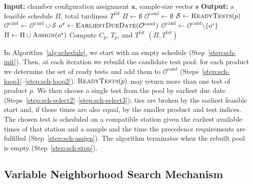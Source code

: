 \documentclass[11pt]{article}
\begin{document}
\begin{algorithm}[H]
\caption{\textsc{Schedule}()}
\label{alg:schedule}
\label{alg:scheduling}
\label{alg:scheduling_procedure}
\label{alg:scheduler_short}
\begin{algorithmic}[1]
\State \textbf{Input:} chamber configuration assignment \(\mathbf{x}\), sample-size vector \(\mathbf{s}\)
\State \textbf{Output:} a feasible schedule \(\Pi\), total tardiness \(T^{tot}\)
\State \(\Pi\leftarrow\emptyset\) \label{step:sch-init}
\Repeat \label{step:sch-loop}
    \State \(\mathcal{O}^{\mathrm{cand}}\leftarrow\emptyset\) \label{step:sch-pool}
     \label{step:sch-loop1}
        \State \(\mathcal{S}\leftarrow\Call{ReadyTests}{p}\) \label{step:sch-ready}
        \State \(\mathcal{O}^{\mathrm{cand}}\leftarrow\mathcal{O}^{\mathrm{cand}}\cup\mathcal{S}\)
    \EndFor \label{step:sch-loop2}
     \label{step:sch-select}
        \State \(o^{\star}\leftarrow\Call{EarliestDueDate}{\mathcal{O}^{\mathrm{cand}}}\) \label{step:sch-select2}
        \State \(\mathcal{O}^{\mathrm{cand}}\leftarrow\mathcal{O}^{\mathrm{cand}}\setminus\{o^{\star}\}\) \label{step:sch-select3}
        \State \(\Pi\leftarrow\Pi\cup\Call{Assign}{o^{\star}}\) \label{step:sch-assign}
    \EndIf
{} \label{step:sch-stop}
\State Compute \(C_p\), \(T_p\), and \(T^{tot}\) \label{step:sch-obj}
\State \Return \((\Pi,T^{tot})\)
\end{algorithmic}
\end{algorithm}

In Algorithm~\ref{alg:schedule}, we start with an empty schedule (Step~\ref{step:sch-init}). Then, at each iteration we rebuild the candidate test pool: for each product we determine the set of ready tests and add them to \(\mathcal{O}^{\mathrm{cand}}\) (Steps~\ref{step:sch-loop1}--\ref{step:sch-loop2}). \(\textsc{ReadyTests}(p)\) may return more than one test of product \(p\). We then choose a single test from the pool by earliest due date (Steps~\ref{step:sch-select2}--\ref{step:sch-select3}); ties are broken by the earliest feasible start and, if those times are also equal, by the smaller product and test indices. The chosen test is scheduled on a compatible station given the earliest available times of that station and a sample and the time the precedence requirements are fulfilled (Step~\ref{step:sch-assign}). The algorithm terminates when the rebuilt pool is empty (Step~\ref{step:sch-stop}).

\subsection{Variable Neighborhood Search Mechanism}
\label{subsec:vns}
\label{subsec:vns_diversification}
\end{document}
